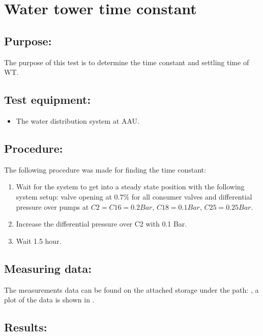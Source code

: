 \section{Water tower time constant}
\label{sec:WT_TimeConstant}

\subsection*{Purpose:}
The purpose of this test is to determine the time constant and settling time of WT.


\subsection*{Test equipment:}
\begin{itemize}
\item The water distribution system at AAU.
\end{itemize}

\subsection*{Procedure:}
The following procedure was made for finding the time constant:
\begin{enumerate}
\item Wait for the system to get into a steady state position with the following system setup: valve opening at $0.7 \%$ for all consumer valves and differential pressure over pumps at $C2 = C16 = 0.2 Bar$, $C18 = 0.1 Bar$, $C25 = 0.25 Bar$.
\item Increase the differential pressure over C2 with 0.1 Bar.
\item Wait 1.5 hour.
\end{enumerate}


\subsection*{Measuring data:}
The measurements data can be found on the attached storage under the path: , a plot of the data is shown in .

\subsection*{Results:}

